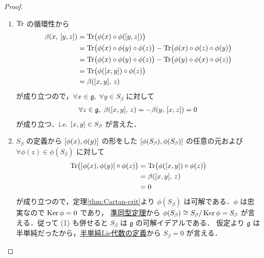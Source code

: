 \documentclass[rep_main]{subfiles}
\begin{document}
\begin{proof}
	\begin{enumerate}
		\item $\Tr$ の循環性から
		\begin{align}
			\beta (x,\, \comm{y}{z}) 
			&= \Tr \bigl( \phi(x) \circ \phi(\comm{y}{z}) \bigr) \\
			&= \Tr \bigl( \phi(x) \circ \phi(y) \circ \phi(z) \bigr) - \Tr \bigl( \phi(x) \circ \phi(z) \circ \phi(y) \bigr) \\
			&= \Tr \bigl( \phi(x) \circ \phi(y) \circ \phi(z) \bigr) - \Tr \bigl( \phi(y) \circ \phi(x) \circ \phi(z) \bigr) \\
			&= \Tr \bigl( \phi(\comm{x}{y}) \circ \phi(z) \bigr) \\
			&= \beta (\comm{x}{y},\, z)
		\end{align}
		が成り立つので，$\forall x \in \mathfrak{g},\; \forall y \in S_\beta$ に対して
		\begin{align}
			\forall z \in \mathfrak{g},\; \beta(\comm{x}{y},\, z) = -\beta (y,\, \comm{x}{z}) = 0
		\end{align}
		が成り立つ．i.e. $\comm{x}{y} \in S_\beta$ が言えた．
		\item $S_\beta$ の定義から $\comm{\phi(x)}{\phi(y)}$ の形をした $\comm{\phi(S_\beta)}{\phi(S_\beta)}$ の任意の元および $\forall \phi(z) \in \phi(S_\beta)$ に対して
		\begin{align}
			\Tr\bigl(\comm{\phi(x)}{\phi(y)} \circ \phi(z)\bigr) 
			&= \Tr \bigl( \phi(\comm{x}{y}) \circ \phi(z) \bigr) \\
			&= \beta (\comm{x}{y},\, z) \\
			&= 0
		\end{align}
		が成り立つので，定理\ref{thm:Cartan-crit}より $\phi(S_\beta)$ は可解である．$\phi$ は忠実なので $\operatorname{Ker} \phi = 0$ であり，
		\hyperref[prop:homo]{準同型定理}から $\phi(S_\beta) \cong S_\beta / \operatorname{Ker} \phi = S_\beta$ が言える．従って (1) も併せると $S_\beta$ は $\mathfrak{g}$ の可解イデアルである．
		仮定より $\mathfrak{g}$ は半単純だったから，\hyperref[def:semisimple-LieAlg]{半単純Lie代数の定義}から $S_\beta = 0$ が言える．
	\end{enumerate}
	
\end{proof}
\end{document}
